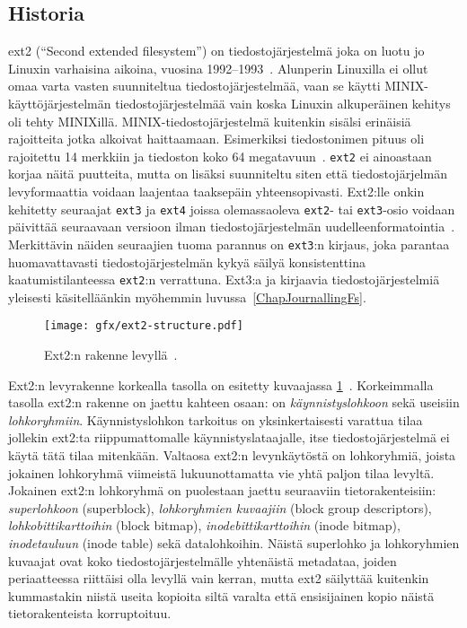 \subsection{Historia}

ext2 (``Second extended filesystem'') on tiedostojärjestelmä joka on luotu jo Linuxin varhaisina aikoina, vuosina 1992--1993~\cite{Ext2Design}.
Alunperin Linuxilla ei ollut omaa varta vasten suunniteltua tiedostojärjestelmää,
vaan se käytti MINIX-käyttöjärjestelmän tiedostojärjestelmää vain koska Linuxin alkuperäinen kehitys oli tehty MINIXillä.
MINIX-tiedostojärjestelmä kuitenkin sisälsi erinäisiä rajoitteita jotka alkoivat haittaamaan.
Esimerkiksi tiedostonimen pituus oli rajoitettu 14 merkkiin ja tiedoston koko 64 megatavuun~\cite{Ext2Design}.
\texttt{ext2} ei ainoastaan korjaa näitä puutteita,
mutta on lisäksi suunniteltu siten että tiedostojärjelmän levyformaattia voidaan laajentaa taaksepäin yhteensopivasti.
Ext2:lle onkin kehitetty seuraajat \texttt{ext3} ja \texttt{ext4} joissa olemassaoleva \texttt{ext2}- tai \texttt{ext3}-osio voidaan päivittää seuraavaan
versioon ilman tiedostojärjestelmän uudelleenformatointia~\cite{Ext4Status}.
Merkittävin näiden seuraajien tuoma parannus on \texttt{ext3}:n kirjaus,
joka parantaa huomavattavasti tiedostojärjestelmän kykyä säilyä konsistenttina kaatumistilanteessa \texttt{ext2}:n verrattuna.
Ext3:a ja kirjaavia tiedostojärjestelmiä yleisesti käsitelläänkin myöhemmin luvussa~\ref{ChapJournallingFs}.

\begin{figure}
    \label{FigExt2DiskFormat}
    \centering
    \texttt{[image: gfx/ext2-structure.pdf]}
    \caption{Ext2:n rakenne levyllä~\cite{LinuxKernelBook}.}
\end{figure}

Ext2:n levyrakenne korkealla tasolla on esitetty kuvaajassa \ref{FigExt2DiskFormat}~\cite{LinuxKernelBook}.
Korkeimmalla tasolla ext2:n rakenne on jaettu kahteen osaan: on \emph{käynnistyslohkoon} sekä useisiin \emph{lohkoryhmiin}.
Käynnistyslohkon tarkoitus on yksinkertaisesti varattua tilaa jollekin ext2:ta riippumattomalle käynnistyslataajalle,
itse tiedostojärjestelmä ei käytä tätä tilaa mitenkään.
Valtaosa ext2:n levynkäytöstä on lohkoryhmiä,
joista jokainen lohkoryhmä viimeistä lukuunottamatta vie yhtä paljon tilaa levyltä.
Jokainen ext2:n lohkoryhmä on puolestaan jaettu seuraaviin tietorakenteisiin:
\emph{superlohkoon} (superblock),
\emph{lohkoryhmien kuvaajiin} (block group descriptors),
\emph{lohkobittikarttoihin} (block bitmap),
\emph{inodebittikarttoihin} (inode bitmap),
\emph{inodetauluun} (inode table) sekä datalohkoihin.
Näistä superlohko ja lohkoryhmien kuvaajat ovat koko tiedostojärjestelmälle yhtenäistä metadataa,
joiden periaatteessa riittäisi olla levyllä vain kerran,
mutta ext2 säilyttää kuitenkin kummastakin niistä useita kopioita siltä varalta että ensisijainen kopio näistä tietorakenteista korruptoituu.

